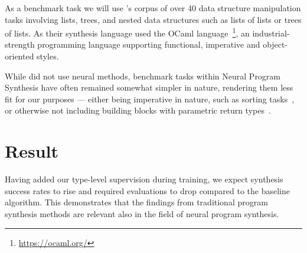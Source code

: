 \documentclass{article}
\begin{document}
As a benchmark task we will use \cite{feser2015synthesizing}'s corpus of over 40 data structure manipulation tasks involving lists, trees, and nested data structures such as lists of lists or trees of lists.
As their synthesis language \cite{feser2015synthesizing} used the OCaml language~\footnote{\url{https://ocaml.org/}}, an industrial-strength programming language supporting functional, imperative and object-oriented styles.

While \cite{feser2015synthesizing} did not use neural methods, benchmark tasks within Neural Program Synthesis have often remained somewhat simpler in nature, rendering them less fit for our purposes --- either being imperative in nature, such as sorting tasks~\citep{reed2015neural}, or otherwise not including building blocks with parametric return types~\citep{nsps}.



\section{Result}

Having added our type-level supervision during training, we expect synthesis success rates to rise and required evaluations to drop compared to the baseline algorithm. This demonstrates that the findings from traditional program synthesis methods are relevant also in the field of neural program synthesis.




\end{document}

